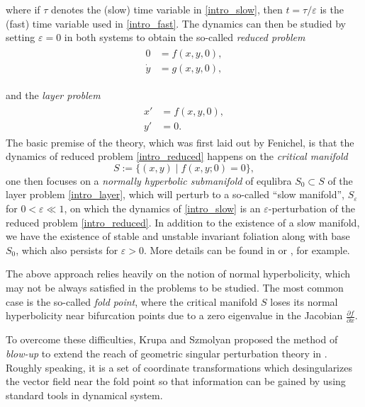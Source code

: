 \documentclass[letterpaper,11pt]{article}
\newcommand{\eps}{\varepsilon}
\numberwithin{equation}{section}
\theoremstyle{plain}
\begin{document}
where if $\tau$ denotes the (slow) time variable in \eqref{intro_slow}, then $t = \tau/\eps$ is the (fast) time variable used in \eqref{intro_fast}. The dynamics can then be studied by setting $\eps = 0$ in both systems to obtain the so-called \textit{reduced problem}
\begin{align}\label{intro_reduced}
\begin{split}
0 &=  f(x,y,0),\\
\dot{y} &=   g(x,y,0),   
\end{split}
\end{align}

and the \textit{layer problem}
\begin{align}\label{intro_layer}
\begin{split}
x' &=  f(x,y,0),\\
y' &=  0. 
\end{split}
\end{align}
The basic premise of the theory, which was first laid out by Fenichel, is that the dynamics of reduced problem \eqref{intro_reduced} happens on the \textit{critical manifold}
\[
S:=  \{ (x,y) \mid f(x,y;0) = 0 \},
\]
one then focuses on a \textit{normally hyperbolic submanifold} of equlibra $S_0 \subset S$ of the layer problem \eqref{intro_layer}, which will perturb to a so-called ``slow manifold'', $S_\eps$ for $0<\eps \ll 1$, on which the dynamics of \eqref{intro_slow} is an $\eps$-perturbation of the reduced problem \eqref{intro_reduced}. In addition to the existence of a slow manifold, we have the existence of stable and unstable invariant foliation along with base $S_0$, which also persists for $\eps>0$. More details can be found in \cite{Jones_GSPT} or \cite{chris_kuehn_book}, for example.

The above approach relies heavily on the notion of normal hyperbolicity, which may not be always satisfied in the problems to be studied. The most common case is the so-called \textit{fold point}, where the critical manifold $S$ loses its normal hyperbolicity near bifurcation points due to a zero eigenvalue in the Jacobian $\frac{\partial f }{\partial x}$.

To overcome these difficulties, Krupa and Szmolyan proposed the method of \textit{blow-up} to extend the reach of geometric singular perturbation theory in \cite{KrupaSz}. Roughly speaking, it is a set of coordinate transformations which desingularizes the vector field near the fold point so that information can be gained by using standard tools in dynamical system.
\end{document}
